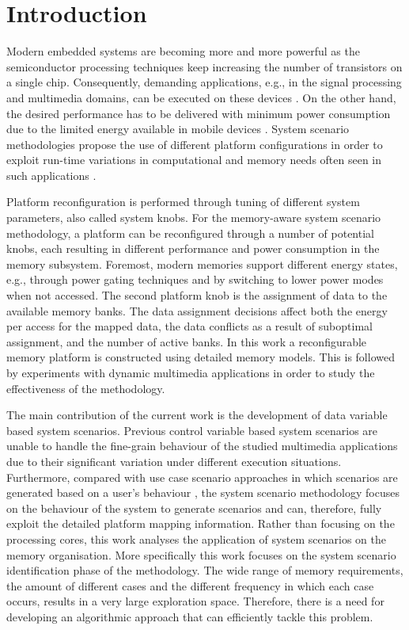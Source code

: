 \documentclass[smallcondensed]{svjour3}
\begin{document}
\section{Introduction}
\label{sec:introduction}

Modern embedded systems are becoming more and more powerful as the semiconductor processing techniques keep increasing the number of transistors on a single chip. 
Consequently, demanding applications, e.g., in the signal processing and multimedia domains, can be executed on these devices \cite{narasinga}. 
On the other hand, the desired performance has to be delivered with minimum power consumption due to the limited energy available in mobile devices \cite{tcm}. 
System scenario methodologies propose the use of different platform configurations in order to exploit run-time variations in computational and memory needs often seen in such applications \cite{tcm}.

Platform reconfiguration is performed through tuning of different system parameters, also called system knobs. 
For the memory-aware system scenario methodology, a platform can be reconfigured through a number of potential knobs, each resulting in different performance and power consumption in the memory subsystem. 
Foremost, modern memories support different energy states, e.g., through power gating techniques and by switching to lower power modes when not accessed. 
The second platform knob is the assignment of data to the available memory banks.
The data assignment decisions affect both the energy per access for the mapped data, the data conflicts as a result of suboptimal assignment, and the number of active banks. 
In this work a reconfigurable memory platform is constructed using detailed memory models. 
This is followed by experiments with dynamic multimedia applications in order to study the effectiveness of the methodology.

The main contribution of the current work is the development of data variable \cite{Elena2012} based system scenarios.
Previous control variable based system scenarios \cite{Gheorghita2007} are unable to handle the fine-grain behaviour of the studied multimedia applications due to their significant variation under different execution situations. 
Furthermore, compared with use case scenario approaches in which scenarios are generated based on a user's behaviour \cite{usecase}, the system scenario methodology focuses on the behaviour of the system to generate scenarios and can, therefore, fully exploit the detailed platform mapping information. 
Rather than focusing on the processing cores, this work analyses the application of system scenarios on the memory organisation. 
More specifically this work focuses on the system scenario identification phase of the methodology.
The wide range of memory requirements, the amount of different cases and the different frequency in which each case occurs, results in a very large exploration space.
Therefore, there is a need for developing an algorithmic approach that can efficiently tackle this problem.
\end{document}
